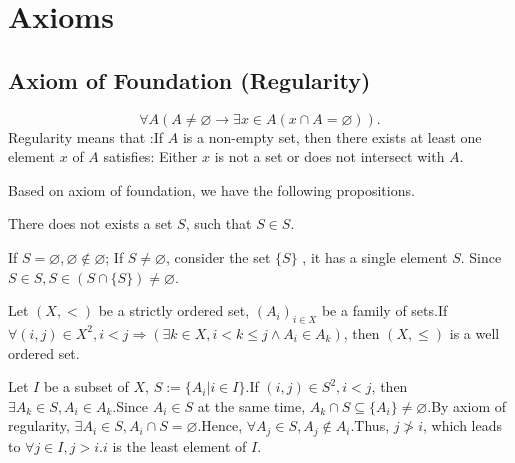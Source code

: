 \appendix












\chapter{Axioms}

\section{Axiom of Foundation (Regularity)}

\begin{axiomenv}
    $$\forall A(A\not=\varnothing\rightarrow\exists x\in A(x\cap A=\varnothing)).$$
    Regularity means that :If $A$ is a non-empty set, then there exists at least one element $x$ of $A$ satisfies: Either $x$ is not a set or does not intersect with $A$.
\end{axiomenv}
Based on axiom of foundation, we have the following propositions.
\begin{propositionenv}
    
    There does not exists a set $S$,  such that $S\in S$.
\end{propositionenv}
\begin{proofenv}
    If $S=\varnothing, \varnothing\notin\varnothing$; If $S\not=\varnothing$, consider the set $\{S\}$ , it has a single element $S$. Since $S\in S, S\in (S\cap\{S\})\not=\varnothing$.
\end{proofenv}
\begin{propositionenv}

    Let $(X, <)$ be a strictly ordered set,  $(A_i)_{i\in X}$ be a family of sets.If $\forall (i, j)\in X^2, i<j\Rightarrow(\exists k\in X, i<k\le j\wedge A_i\in A_k)$,  then $(X, \le)$ is a well ordered set.
\end{propositionenv}
\begin{proofenv}
    
    Let $I$ be a subset of $X$,  $S:=\{A_i|i\in I\}$.If $(i, j)\in S^2, i<j$,  then $\exists A_k\in S, A_i\in A_k$.Since $A_i\in S$ at the same time,  $A_k\cap S\subseteq\{A_i\}\not=\varnothing$.By axiom of regularity, $\exists A_i\in S, A_i\cap S=\varnothing$.Hence, $\forall A_j\in S, A_j\notin A_i$.Thus, $j\not>i$, which leads to $\forall j\in I,  j>i$.$i$ is the least element of $I$.
\end{proofenv}
